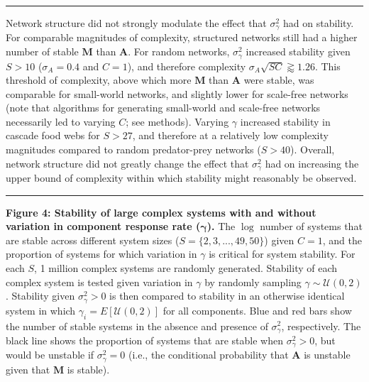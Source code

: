 \documentclass[]{article}
\begin{document}
\vspace{2mm}
\hrule

Network structure did not strongly modulate the effect that
\(\sigma^{2}_{\gamma}\) had on stability. For comparable magnitudes of
complexity, structured networks still had a higher number of stable
\(\mathbf{M}\) than \(\mathbf{A}\). For random networks,
\(\sigma^{2}_{\gamma}\) increased stability given \(S > 10\)
(\(\sigma_{A} = 0.4\) and \(C = 1\)), and therefore complexity
\(\sigma_{A} \sqrt{SC} \gtrapprox 1.26\). This threshold of complexity,
above which more \(\mathbf{M}\) than \(\mathbf{A}\) were stable, was
comparable for small-world networks, and slightly lower for scale-free
networks (note that algorithms for generating small-world and scale-free
networks necessarily led to varying \(C\); see methods). Varying
\(\gamma\) increased stability in cascade food webs for \(S > 27\), and
therefore at a relatively low complexity magnitudes compared to random
predator-prey networks (\(S > 40\)). Overall, network structure did not
greatly change the effect that \(\sigma^{2}_{\gamma}\) had on increasing
the upper bound of complexity within which stability might reasonably be
observed.

\vspace{2mm}
\hrule
\vspace{2mm}

\textbf{Figure 4: Stability of large complex systems with and without
variation in component response rate (\(\boldsymbol{\gamma}\)).} The
\(\log\) number of systems that are stable across different system sizes
(\(S = \{2, 3, ..., 49, 50 \}\)) given \(C = 1\), and the proportion of
systems for which variation in \(\gamma\) is critical for system
stability. For each \(S\), 1 million complex systems are randomly
generated. Stability of each complex system is tested given variation in
\(\gamma\) by randomly sampling \(\gamma \sim \mathcal{U}(0, 2)\).
Stability given \(\sigma^{2}_{\gamma}>0\) is then compared to stability
in an otherwise identical system in which
\(\gamma_{i} = E[\mathcal{U}(0, 2)]\) for all components. Blue and red
bars show the number of stable systems in the absence and presence of
\(\sigma^{2}_{\gamma}\), respectively. The black line shows the
proportion of systems that are stable when \(\sigma^{2}_{\gamma}>0\),
but would be unstable if \(\sigma^{2}_{\gamma}=0\) (i.e., the
conditional probability that \(\mathbf{A}\) is unstable given that
\(\mathbf{M}\) is stable).
\end{document}
